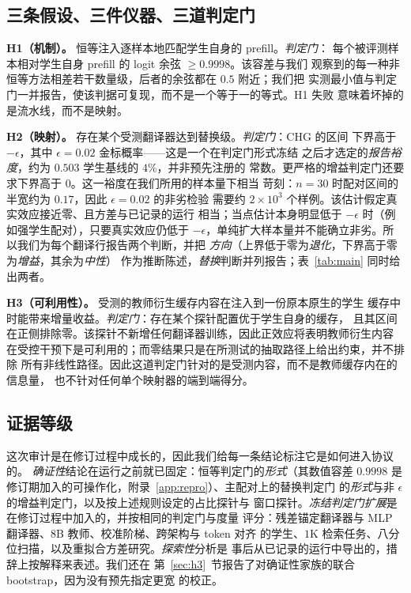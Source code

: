 \documentclass[10pt,a4paper,fontset=fandol]{ctexart}
\begin{document}
\subsection{三条假设、三件仪器、三道判定门}

\textbf{H1（机制）。} 恒等注入逐样本地匹配学生自身的 prefill。\emph{判定门}：
每个被评测样本相对学生自身 prefill 的 logit 余弦 $\ge 0.9998$。该容差与我们
观察到的每一种非恒等方法相差若干数量级，后者的余弦都在 $0.5$ 附近；我们把
实测最小值与判定门一并报告，使该判据可复现，而不是一个等于一的等式。H1 失败
意味着坏掉的是流水线，而不是映射。

\textbf{H2（映射）。} 存在某个受测翻译器达到替换级。\emph{判定门}：CHG 的区间
下界高于 $-\epsilon$，其中 $\epsilon=0.02$ 金标概率——这是一个在判定门形式冻结
之后才选定的\emph{报告裕度}，约为 $0.503$ 学生基线的 $4\%$，并非预先注册的
常数。更严格的增益判定门还要求下界高于 $0$。这一裕度在我们所用的样本量下相当
苛刻：$n{=}30$ 时配对区间的半宽约为 $0.17$，因此 $\epsilon{=}0.02$ 的非劣检验
需要约 $2\times10^{3}$ 个样例。该估计假定真实效应接近零、且方差与已记录的运行
相当；当点估计本身明显低于 $-\epsilon$ 时（例如强学生配对），只要真实效应仍低于
$-\epsilon$，单纯扩大样本量并不能确立非劣。所以我们为每个翻译行报告两个判断，并把
\emph{方向}（上界低于零为\emph{退化}，下界高于零为\emph{增益}，其余为\emph{中性}）
作为推断陈述，\emph{替换}判断并列报告；表~\ref{tab:main} 同时给出两者。

\textbf{H3（可利用性）。} 受测的教师衍生缓存内容在注入到一份原本原生的学生
缓存中时能带来增量收益。\emph{判定门}：存在某个探针配置优于学生自身的缓存，
且其区间在正侧排除零。该探针不新增任何翻译器训练，因此正效应将表明教师衍生内容
在受控干预下是可利用的；而零结果只是在所测试的抽取路径上给出约束，并不排除
所有非线性路径。因此这道判定门针对的是受测内容，而不是教师缓存内在的信息量，
也不针对任何单个映射器的端到端得分。

\subsection{证据等级}
\label{sec:tiers}

这次审计是在修订过程中成长的，因此我们给每一条结论标注它是如何进入协议的。
\emph{确证性}结论在运行之前就已固定：恒等判定门的\emph{形式}（其数值容差
$0.9998$ 是修订期加入的可操作化，附录~\ref{app:repro}）、主配对上的替换判定门
的\emph{形式}与非 $\epsilon$ 的增益判定门，以及按上述规则设定的占比探针与
窗口探针。\emph{冻结判定门扩展}是在修订过程中加入的，并按相同的判定门与度量
评分：残差锚定翻译器与 MLP 翻译器、$8$B 教师、校准阶梯、跨架构与 token 对齐
的学生、$1$K 检索任务、八分位扫描，以及重拟合方差研究。\emph{探索性}分析是
事后从已记录的运行中导出的，措辞上按解释来表述。我们还在
第~\ref{sec:h3}~节报告了对确证性家族的联合 bootstrap，因为没有预先指定更宽
的校正。
\end{document}
